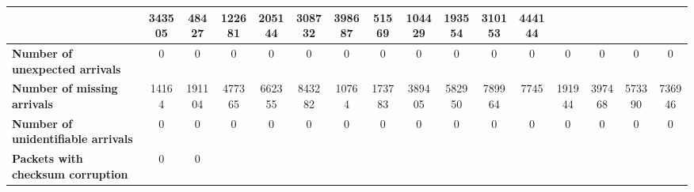\begin{table}[!h]
{\begin{tabular}{|l|ccccc|ccccc|ccccc|}
            & \multicolumn{1}{c|}{343505}
            & \multicolumn{1}{c|}{48427}
            & \multicolumn{1}{c|}{122681}
            & \multicolumn{1}{c|}{205144}
            & \multicolumn{1}{c|}{308732}
            & \multicolumn{1}{c|}{398687}
            & \multicolumn{1}{c|}{51569}
            & \multicolumn{1}{c|}{104429}
            & \multicolumn{1}{c|}{193554}
            & \multicolumn{1}{c|}{310153}
            & \multicolumn{1}{c|}{444144}
            \\ \hline
            \textbf{Number of unexpected arrivals} & \multicolumn{1}{c|}{0} & \multicolumn{1}{c|}{0}
            & \multicolumn{1}{c|}{0}
            & \multicolumn{1}{c|}{0}
            & \multicolumn{1}{c|}{0}
            & \multicolumn{1}{c|}{0}
            & \multicolumn{1}{c|}{0}
            & \multicolumn{1}{c|}{0}
            & \multicolumn{1}{c|}{0}
            & \multicolumn{1}{c|}{0}
            & \multicolumn{1}{c|}{0}
            & \multicolumn{1}{c|}{0}
            & \multicolumn{1}{c|}{0}
            & \multicolumn{1}{c|}{0}
            & \multicolumn{1}{c|}{0}
            \\ \hline
            \textbf{Number of missing arrivals} & \multicolumn{1}{c|}{14164} & \multicolumn{1}{c|}{191104}
            & \multicolumn{1}{c|}{477365}
            & \multicolumn{1}{c|}{662355}
            & \multicolumn{1}{c|}{843282}
            & \multicolumn{1}{c|}{10764}
            & \multicolumn{1}{c|}{173783}
            & \multicolumn{1}{c|}{389405}
            & \multicolumn{1}{c|}{582950}
            & \multicolumn{1}{c|}{789964}
            & \multicolumn{1}{c|}{7745}
            & \multicolumn{1}{c|}{191944}
            & \multicolumn{1}{c|}{397468}
            & \multicolumn{1}{c|}{573390}
            & \multicolumn{1}{c|}{736946}
            \\ \hline
            \textbf{Number of unidentifiable arrivals} & \multicolumn{1}{c|}{0} & \multicolumn{1}{c|}{0}
            & \multicolumn{1}{c|}{0}
            & \multicolumn{1}{c|}{0}
            & \multicolumn{1}{c|}{0}
            & \multicolumn{1}{c|}{0}
            & \multicolumn{1}{c|}{0}
            & \multicolumn{1}{c|}{0}
            & \multicolumn{1}{c|}{0}
            & \multicolumn{1}{c|}{0}
            & \multicolumn{1}{c|}{0}
            & \multicolumn{1}{c|}{0}
            & \multicolumn{1}{c|}{0}
            & \multicolumn{1}{c|}{0}
            & \multicolumn{1}{c|}{0}
            \\ \hline
            \textbf{Packets with checksum corruption} & \multicolumn{1}{c|}{0} & \multicolumn{1}{c|}{0}

\end{tabular}}
\end{table}
